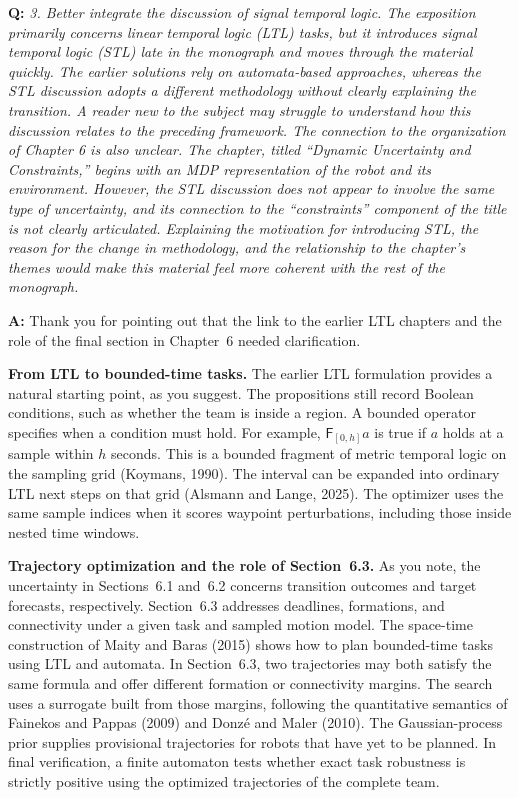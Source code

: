\documentclass[11pt]{article}
\begin{document}
\begin{shaded*}
\noindent\textbf{Q:} \emph{3. Better integrate the discussion of signal
temporal logic. The exposition primarily concerns linear temporal logic (LTL) tasks, but
it introduces signal temporal logic (STL) late in the monograph and moves through the
material quickly. The earlier solutions rely on automata-based approaches, whereas the STL
discussion adopts a different methodology without clearly explaining the transition. A
reader new to the subject may struggle to understand how this discussion relates to the
preceding framework. The connection to the organization of Chapter 6 is also unclear. The
chapter, titled ``Dynamic Uncertainty and Constraints,'' begins with an MDP representation
of the robot and its environment. However, the STL discussion does not appear to involve
the same type of uncertainty, and its connection to the ``constraints'' component of the
title is not clearly articulated. Explaining the motivation for introducing STL, the
reason for the change in methodology, and the relationship to the chapter's themes would
make this material feel more coherent with the rest of the monograph.}
\end{shaded*}
\noindent\textbf{A:} Thank you for pointing out that the link to the earlier LTL
chapters and the role of the final section in Chapter~6 needed clarification.

\textbf{From LTL to bounded-time tasks.} The earlier LTL formulation provides a
natural starting point, as you suggest. The propositions still record Boolean conditions,
such as whether the team is inside a region. A bounded operator specifies when a condition
must hold. For example, $\mathsf{F}_{[0,h]}a$ is true if $a$ holds at a sample within
$h$ seconds. This is a bounded fragment of metric temporal logic on the sampling grid
(Koymans, 1990). The interval can be expanded into ordinary LTL next steps on that grid
(Alsmann and Lange, 2025). The optimizer uses the same sample indices when it scores
waypoint perturbations, including those inside nested time windows.

\textbf{Trajectory optimization and the role of Section~6.3.} As you note, the
uncertainty in Sections~6.1 and~6.2 concerns transition outcomes and target forecasts,
respectively. Section~6.3 addresses deadlines, formations, and connectivity under a
given task and sampled motion model. The space-time construction of Maity and Baras
(2015) shows how to plan bounded-time tasks using LTL and automata. In Section~6.3,
two trajectories may both satisfy the same formula and offer different formation or
connectivity margins. The search uses a surrogate built from those margins,
following the quantitative semantics of Fainekos and Pappas (2009) and Donz\'e and
Maler (2010). The Gaussian-process prior supplies provisional trajectories for
robots that have yet to be planned. In final verification, a finite automaton tests
whether exact task robustness is strictly positive using the optimized trajectories
of the complete team.
\end{document}

